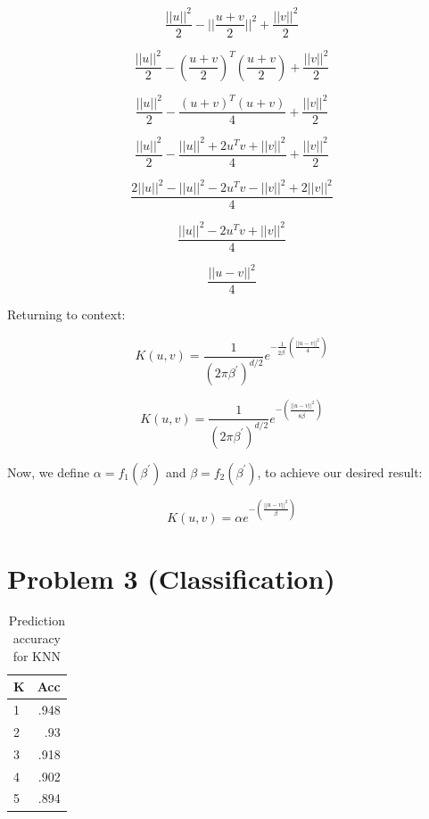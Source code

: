 \documentclass[11pt]{article}
\begin{document}
\[
\frac{||u||^2}{2} - ||\frac{u+v}{2}||^2  + \frac{||v||^2}{2}
\]

\[
\frac{||u||^2}{2} - (\frac{u+v}{2})^T(\frac{u+v}{2})  + \frac{||v||^2}{2}
\]

\[
\frac{||u||^2}{2} - \frac{(u+v)^T(u+v)}{4} + \frac{||v||^2}{2}
\]

\[
\frac{||u||^2}{2} - \frac{||u||^2 + 2u^Tv + ||v||^2}{4}  + \frac{||v||^2}{2}
\]

\[
\frac{2||u||^2 - ||u||^2 - 2u^Tv - ||v||^2 + 2||v||^2}{4}
\]

\[
\frac{||u||^2 - 2u^Tv  + ||v||^2}{4}
\]

\[
\frac{||u - v||^2}{4}
\]

Returning to context:

\[
K(u, v) = \frac{1}{(2\pi\beta^\prime)^{d/2}}e^{-\frac{1}{2\beta^\prime}(\frac{||u - v||^2}{4})}
\]

\[
K(u, v) = \frac{1}{(2\pi\beta^\prime)^{d/2}}e^{-(\frac{||u - v||^2}{8\beta^\prime})}
\]

Now, we define $\alpha = f_1(\beta^\prime)$ and $\beta = f_2(\beta^\prime)$, to achieve our desired result:

\[
K(u, v) = \alpha e^{-(\frac{||u - v||^2}{\beta})}
\]

\section*{Problem 3 (Classification)}

\begin{table}[!th]
\centering
\begin{tabular}{|l|r|}
\hline
K &  Acc \\
\hline
1 & .948 \\
2 & .93  \\
3 & .918 \\
4 & .902 \\
5 & .894 \\
\hline
\end{tabular}
\caption{Prediction accuracy for KNN}
\label{ex:table}
\end{table}
\end{document}
